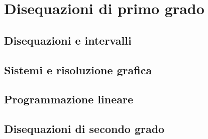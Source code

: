 \section{Disequazioni di primo grado}

\subsection{Disequazioni e intervalli}
\subsection{Sistemi e risoluzione grafica}
\subsection{Programmazione lineare}

\subsection{Disequazioni di secondo grado}

